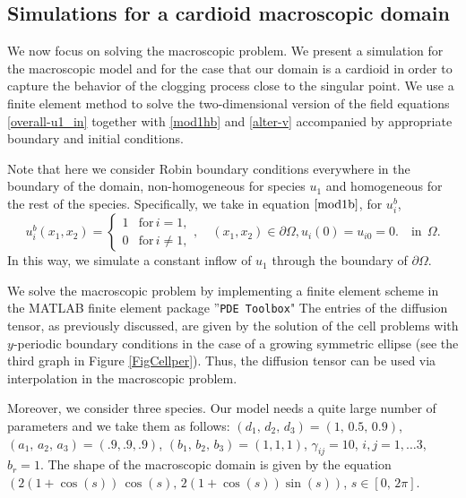 \documentclass[reqno, 11pt]{amsart}
\numberwithin{equation}{section}
\newcommand{\ee}{{\mathrm{e}}}
\def\be{\begin{equation}}
\def\ee{\end{equation}}
\def\bse{\begin{subequations}}
\def\ese{\end{subequations}}
\begin{document}

\subsection{Simulations for a cardioid macroscopic domain} 
We now focus on solving the macroscopic problem. 
We present a simulation for the macroscopic model and for the case that our domain is 
a cardioid
in order to capture the behavior of the clogging process close to the singular point.
We use a finite element method to solve the two-dimensional version of the field equations 
 \eqref{overall-u1_in} together with \eqref{mod1hb} and \eqref{alter-v} accompanied by appropriate boundary and initial conditions.

Note that here we consider Robin boundary conditions everywhere in the boundary of the domain,
non-homogeneous for species $u_1$ and homogeneous for the rest of the species. Specifically, we take in equation $\eqref{mod1b}$, for $u_i^b$, 
\bse
 \be \label{mod1b_L}
  u_i^b(x_1,x_2)=
  \left\{\begin{array}{cc}
   1 & \mbox{for}\, i=1,\\
  0         &  \mbox{for}\, i\neq 1,
 \end{array}\right., \quad (x_1, x_2)\in \partial \Omega,
 \ee
  \be
  u_i(0)=u_{i0}=0. \quad \text{in}\ \ \Omega.\label{overall-u3_L}
  \ee
\ese
In this way, we simulate a constant inflow of $u_1$ through the boundary of $\partial \Omega$.


We solve the macroscopic problem by implementing a finite element scheme in the MATLAB finite element  package ''\texttt{PDE Toolbox}"
The entries of the diffusion tensor, as previously discussed, are given by the solution of the cell problems with $y$-periodic boundary conditions in the case of a growing symmetric ellipse (see the third graph in Figure \ref{FigCellper}). Thus, the diffusion tensor can be used via interpolation in the macroscopic problem.

Moreover, we consider three species. Our model needs a quite large number of parameters and we take them as follows: $(d_1,\,d_2,\,d_3)=(1,\, 0.5,\, 0.9)$, $(a_1,\,a_2,\,a_3)=(.9,.9,.9)$, $(b_1,\,b_2,\,b_3)=(1,1,1)$,
$\gamma_{ij}=10$, $i,j=1,\ldots 3$, $b_r=1$.
 The shape of the macroscopic domain is given by the equation $( 2(1+\cos(s))\,\cos(s),\,2 (1+\cos(s))\sin(s))$, $s\in [0,\,2\pi]$.
\end{document}
